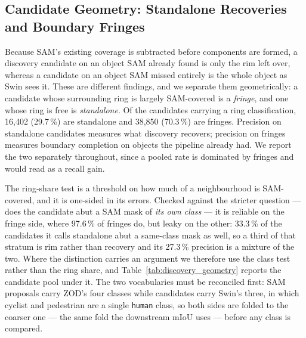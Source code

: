 \documentclass[conference]{IEEEtran}
\begin{document}
\subsection{Candidate Geometry: Standalone Recoveries and Boundary Fringes}
Because SAM's existing coverage is subtracted before components are formed, a discovery candidate on an
object SAM already found is only the rim left over, whereas a candidate on an object SAM missed entirely
is the whole object as Swin sees it. These are different findings, and we separate them geometrically:
a candidate whose surrounding ring is largely SAM-covered is a \emph{fringe}, and one whose ring is free
is \emph{standalone}. Of the candidates carrying a ring classification, 16{,}402 (29.7\,\%) are standalone and
38{,}850 (70.3\,\%) are fringes. Precision on standalone candidates measures what discovery recovers;
precision on fringes measures boundary completion on objects the pipeline already had. We report the two
separately throughout, since a pooled rate is dominated by fringes and would read as a recall gain.

The ring-share test is a threshold on how much of a neighbourhood is SAM-covered, and it is one-sided in
its errors. Checked against the stricter question --- does the candidate abut a SAM mask of \emph{its
own class} --- it is reliable on the fringe side, where 97.6\,\% of fringes do, but leaky on the other:
33.3\,\% of the candidates it calls standalone abut a same-class mask as well, so a third of that
stratum is rim rather than recovery and its 27.3\,\% precision is a mixture of the two.
Where the distinction carries an argument we therefore use the class test rather than the ring share,
and Table~\ref{tab:discovery_geometry} reports the candidate pool under it.
The two vocabularies must be reconciled first: SAM proposals carry ZOD's four classes while candidates
carry Swin's three, in which cyclist and pedestrian are a single \texttt{human} class, so both sides are
folded to the coarser one --- the same fold the downstream mIoU uses --- before any class is compared.
\end{document}
